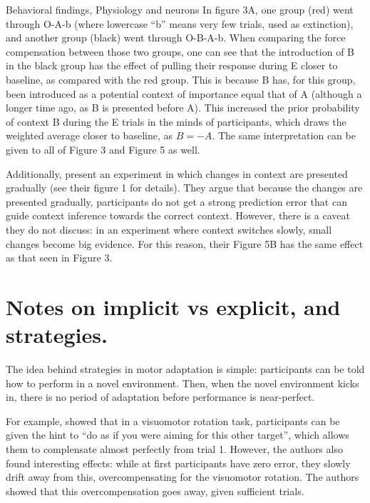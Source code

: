 \documentclass{report}
\begin{document}
\begin{chapter}{Behavioral findings, Physiology and neurons}
In figure 3A, one group (red) went through O-A-b (where lowercase ``b'' means
very few trials, used as extinction), and another group (black) went through
O-B-A-b. When comparing the force compensation between those two groups, one
can see that the introduction of B in the black group has the effect of pulling
their response during E closer to baseline, as compared with the red
group. This is because B has, for this group, been introduced as a potential
context of importance equal that of A (although a longer time ago, as B is
presented before A). This increased the prior probability of context B during
the E trials in the minds of participants, which draws the weighted average
closer to baseline, as $B = -A$. The same interpretation can be given to all of
Figure 3 and Figure 5 as well.

Additionally, \cite{Pekny_Protection_2011} present an experiment in which
changes in context are presented gradually (see their figure 1 for
details). They argue that because the changes are presented gradually,
participants do not get a strong prediction error that can guide context
inference towards the correct context. However, there is a caveat they do not
discuss: in an experiment where context switches slowly, small changes become
big evidence. For this reason, their Figure 5B has the same effect as that seen
in Figure 3.


\section{Notes on implicit vs explicit, and strategies.}
The idea behind strategies in motor adaptation is simple: participants can be
told how to perform in a novel environment. Then, when the novel environment
kicks in, there is no period of adaptation before performance is near-perfect.

For example, \cite{Taylor_Flexible_2011,Mazzoni_Implicit_2006} showed that in a
visuomotor rotation task, participants can be given the hint to ``do as if you
were aiming for this other target'', which allows them to complensate almost
perfectly from trial 1. However, the authors also found interesting effects:
while at first participants have zero error, they slowly drift away from this,
overcompensating for the visuomotor rotation. The authors showed that this
overcompensation goes away, given sufficient trials.


\end{chapter}
\end{document}
